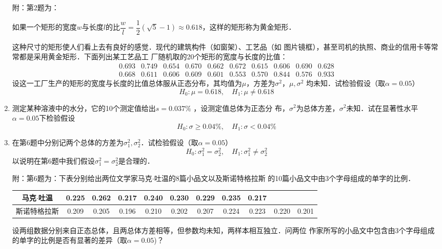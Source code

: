 \documentclass[10pt,a4paper]{article}
\begin{document}
\begin{enumerate}
    {\kaishu 附：第2题为：    \begin{spacing}{1.5}
        如果一个矩形的宽度$w$与长度$l$的比$\dfrac{w}{l}=\dfrac{1}{2}(\sqrt{5}-1)\approx 0.618$，这样的矩形称为黄金矩形．
        \end{spacing}
        这种尺寸的矩形使人们看上去有良好的感觉．现代的建筑构件（如窗架）、工艺品（如
        图片镜框），甚至司机的执照、商业的信用卡等常常都是采用黄金矩形．下面列出某工艺品工
        厂随机取的20个矩形的宽度与长度的比值：
        $$\begin{array}{cccccccccc}
            0.693 & 0.749 & 0.654 & 0.670 & 0.662  & 0.672 &  0.615 &  0.606 & 0.690 & 0.628\\
            0.668 & 0.611 & 0.606 & 0.609  & 0.601 & 0.553 & 0.570  & 0.844 &  0.576 &  0.933 
        \end{array}$$
        设这一工厂生产的矩形的宽度与长度的比值总体服从正态分布，其均值为$\mu$，方差为$\sigma^2$，$\mu,\sigma^2$
        均未知．试检验假设（取$\alpha=0.05$）
        $$H_0:\mu=0.618,\quad H_1:\mu\neq 0.618$$}
    \clearpage



    \item 测定某种溶液中的水分，它的10个测定值给出$s=0.037\%$ ，设测定值总体为正态分
    布，$\sigma^2$为总体方差，$\sigma^2$未知．试在显著性水平$\alpha=0.05$下检验假设
    $$H_0:\sigma\geq 0.04\%,\quad H_1:\sigma<0.04\%$$
    \clearpage



    \item 在第6题中分别记两个总体的方差为$\sigma_1^2,\sigma_2^2$．试检验假设（取$\alpha=0.05$）
    $$H_0:\sigma_1^2=\sigma_2^2, \quad H_1:\sigma_1^2\neq \sigma^2_2$$
    以说明在第6题中我们假设$\sigma_1^2=\sigma_2^2$是合理的．
    
    {\kaishu 附：第6题为：下表分别给出两位文学家马克$\cdot$吐温的8篇小品文以及斯诺特格拉斯
    的10篇小品文中由3个字母组成的单字的比例．
    \renewcommand{\arraystretch}{1.3}
    \begin{table}[H]\centering
        \begin{tabular}{c|cccccccccc}
        马克$\cdot$吐温 & 0.225 & 0.262 & 0.217 & 0.240 & 0.230 & 0.229 & 0.235 & 0.217 &  &  \\ \hline
        斯诺特格拉斯 & 0.209 & 0.205 & 0.196 & 0.210 & 0.202 & 0.207 & 0.224 & 0.223 & 0.220 & 0.201
    \end{tabular}
    \end{table}
    \renewcommand{\arraystretch}{1.0}
    设两组数据分别来自正态总体，且两总体方差相等，但参数均未知，两样本相互独立．问两位
    作家所写的小品文中包含由3个字母组成的单字的比例是否有显著的差异（取$\alpha=0.05$)？}
    \clearpage





\end{enumerate}
\end{document}
